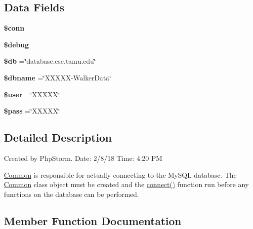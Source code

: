 \subsection*{Data Fields}
\begin{DoxyCompactItemize}
\item 
{\bfseries \$conn}\hypertarget{class_common_aa8a5a87b9c1a6a0819b88447cbe41877}{}\label{class_common_aa8a5a87b9c1a6a0819b88447cbe41877}

\item 
{\bfseries \$debug}\hypertarget{class_common_a85ae3e64cd40e9564adceb010085e9dd}{}\label{class_common_a85ae3e64cd40e9564adceb010085e9dd}

\item 
{\bfseries \$db} =\char`\"{}database.\+cse.\+tamu.\+edu\char`\"{}\hypertarget{class_common_a1fa3127fc82f96b1436d871ef02be319}{}\label{class_common_a1fa3127fc82f96b1436d871ef02be319}

\item 
{\bfseries \$dbname} =\char`\"{}X\+X\+X\+XX-\/Walker\+Data\char`\"{}\hypertarget{class_common_ac5111a571fffa2499732833bb7f0d8c1}{}\label{class_common_ac5111a571fffa2499732833bb7f0d8c1}

\item 
{\bfseries \$user} =\char`\"{}X\+X\+X\+XX\char`\"{}\hypertarget{class_common_a598ca4e71b15a1313ec95f0df1027ca5}{}\label{class_common_a598ca4e71b15a1313ec95f0df1027ca5}

\item 
{\bfseries \$pass} =\char`\"{}X\+X\+X\+XX\char`\"{}\hypertarget{class_common_a12ec2780b52bd1c54d38c2f981c0349f}{}\label{class_common_a12ec2780b52bd1c54d38c2f981c0349f}

\end{DoxyCompactItemize}


\subsection{Detailed Description}
Created by Php\+Storm. Date\+: 2/8/18 Time\+: 4\+:20 PM

\hyperlink{class_common}{Common} is responsible for actually connecting to the My\+S\+QL database. The \hyperlink{class_common}{Common} class object must be created and the \hyperlink{class_common_a1b1bd9b3f45a5fbd2549355282cdc96f}{connect()} function run before any functions on the database can be performed. 

\subsection{Member Function Documentation}
